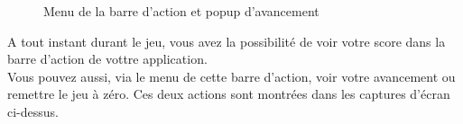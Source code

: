 \documentclass[11pt]{scrreprt}
\begin{document}
\begin{figure}[H]
{        }
        \caption{Menu de la barre d'action et popup d'avancement}
    \end{figure}

    A tout instant durant le jeu, vous avez la possibilité de voir votre score dans la barre d'action de vottre application.\\

    Vous pouvez aussi, via le menu de cette barre d'action, voir votre avancement ou remettre le jeu à zéro. Ces deux actions sont montrées dans les captures d'écran ci-dessus.
\end{document}
